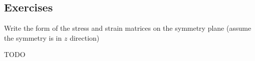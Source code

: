 \documentclass[12pt,class=article,crop=false,preview=false]{standalone}
\begin{document}
\subsection*{Exercises}

\begin{exercise}
    Write the form of the stress and strain matrices on the symmetry plane (assume the symmetry is in $z$ direction)
\end{exercise}

\begin{exercise}
    TODO
\end{exercise}
\end{document}

